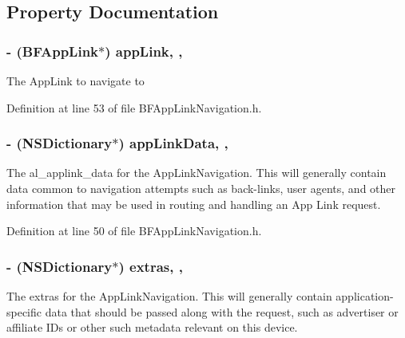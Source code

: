 \subsection{Property Documentation}
\hypertarget{interface_b_f_app_link_navigation_a052e0aa4d7101904ca825a21712cdd7b}{}
\subsubsection[{app\+Link}]{\setlength{\rightskip}{0pt plus 5cm}-\/ ({\bf B\+F\+App\+Link}$\ast$) app\+Link\hspace{0.3cm}{\ttfamily [read]}, {\ttfamily [nonatomic]}, {\ttfamily [strong]}}\label{interface_b_f_app_link_navigation_a052e0aa4d7101904ca825a21712cdd7b}
The App\+Link to navigate to 

Definition at line 53 of file B\+F\+App\+Link\+Navigation.\+h.

\hypertarget{interface_b_f_app_link_navigation_a2412a1d4fa49c52d7883bee810e5026d}{}
\subsubsection[{app\+Link\+Data}]{\setlength{\rightskip}{0pt plus 5cm}-\/ (N\+S\+Dictionary$\ast$) app\+Link\+Data\hspace{0.3cm}{\ttfamily [read]}, {\ttfamily [nonatomic]}, {\ttfamily [copy]}}\label{interface_b_f_app_link_navigation_a2412a1d4fa49c52d7883bee810e5026d}
The al\+\_\+applink\+\_\+data for the App\+Link\+Navigation. This will generally contain data common to navigation attempts such as back-\/links, user agents, and other information that may be used in routing and handling an App Link request. 

Definition at line 50 of file B\+F\+App\+Link\+Navigation.\+h.

\hypertarget{interface_b_f_app_link_navigation_a75478e20d3d2f13c93e8d0cd79b20b2c}{}
\subsubsection[{extras}]{\setlength{\rightskip}{0pt plus 5cm}-\/ (N\+S\+Dictionary$\ast$) extras\hspace{0.3cm}{\ttfamily [read]}, {\ttfamily [nonatomic]}, {\ttfamily [copy]}}\label{interface_b_f_app_link_navigation_a75478e20d3d2f13c93e8d0cd79b20b2c}
The extras for the App\+Link\+Navigation. This will generally contain application-\/specific data that should be passed along with the request, such as advertiser or affiliate I\+Ds or other such metadata relevant on this device. 

